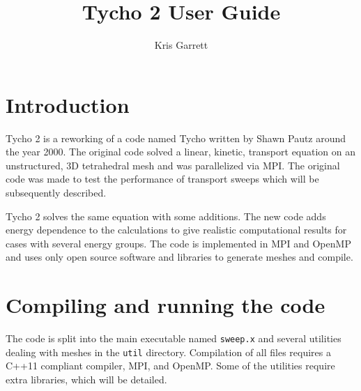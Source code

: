 \documentclass[12pt,letterpaper]{article}
\author{Kris Garrett}
\title{Tycho 2 User Guide}
\begin{document}
\maketitle


\section{Introduction}
Tycho 2 is a reworking of a code named Tycho written by Shawn Pautz around the year 2000.
The original code solved a linear, kinetic, transport equation on an unstructured, 3D tetrahedral mesh and was parallelized via MPI.
The original code was made to test the performance of transport sweeps which will be subsequently described.

Tycho 2 solves the same equation with some additions.
The new code adds energy dependence to the calculations to give realistic computational results for cases with several energy groups.
The code is implemented in MPI and OpenMP and uses only open source software and libraries to generate meshes and compile.







\section{Compiling and running the code}
The code is split into the main executable named {\tt sweep.x} and several utilities dealing with meshes in the {\tt util} directory.
Compilation of all files requires a C++11 compliant compiler, MPI, and OpenMP.
Some of the utilities require extra libraries, which will be detailed.
\end{document}
